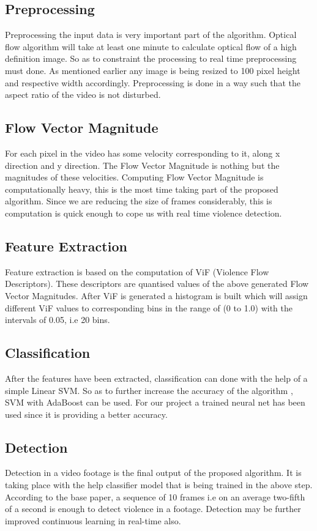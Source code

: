 \subsection{Preprocessing}
Preprocessing the input data is very important part of the algorithm. Optical flow algorithm will take at least one minute to calculate optical flow of a high definition image. So as to constraint the processing to real time preprocessing must done. As mentioned earlier any image is being resized to 100 pixel height and respective width accordingly. Preprocessing is done in a way such that the aspect ratio of the video is not disturbed.
\subsection{Flow Vector Magnitude}
For each pixel in the video has some velocity corresponding to it, along x direction and y direction. The Flow Vector Magnitude is nothing but the magnitudes of these velocities. Computing Flow Vector Magnitude is computationally heavy, this is the most time taking part of the proposed algorithm. Since we are reducing the size of frames considerably, this is computation is quick enough to cope us with real time violence detection.
\subsection{Feature Extraction}
Feature extraction is based on the computation of ViF (Violence Flow Descriptors). These descriptors are quantised values of the above generated Flow Vector Magnitudes. After ViF is generated a histogram is built which will assign different ViF values to corresponding bins in the range of (0 to 1.0) with the intervals of 0.05, i.e 20 bins.
\subsection{Classification}
After the features have been extracted, classification can done with the help of a simple Linear SVM. So as to further increase the accuracy of the algorithm , SVM with AdaBoost can be used. For our project a trained neural net has been used since it is providing a better accuracy.
\subsection{Detection}
Detection in a video footage is the final output of the proposed algorithm. It is taking place with the help classifier model that is being trained in the above step. According to the base paper, a sequence of 10 frames i.e on an average two-fifth of a second is enough to detect violence in a footage. Detection may be further improved continuous learning in real-time also.
